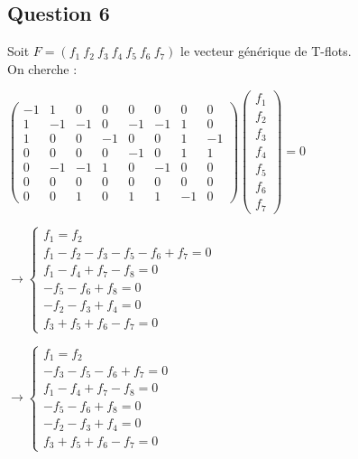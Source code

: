 \subsection{Question 6}
Soit $F=(f_1\ f_2\ f_3\ f_4\ f_5\ f_6\ f_7)$ le vecteur générique de T-flots.\\
On cherche : 
\begin{center}

$\begin{pmatrix}
-1 & 1 & 0 & 0 & 0 & 0 & 0 & 0\\
 1 &-1 &-1 & 0 &-1 &-1 & 1 & 0\\
 1 & 0 & 0 &-1 & 0 & 0 & 1 &-1\\
 0 & 0 & 0 & 0 &-1 & 0 & 1 & 1\\
 0 &-1 &-1 & 1 & 0 &-1 & 0 & 0\\
 0 & 0 & 0 & 0 & 0 & 0 & 0 & 0\\
 0 & 0 & 1 & 0 & 1 & 1 &-1 & 0
\end{pmatrix}
\begin{pmatrix}
f_1\\
f_2\\ 
f_3\\ 
f_4\\ 
f_5\\ 
f_6\\ 
f_7
\end{pmatrix}
=0
$

\vspace{0.5cm}

$\rightarrow 
\begin{cases}
f_1 = f_2\\
f_1 - f_2 - f_3 - f_5 - f_6 + f_7 = 0\\
f_1 - f_4 + f_7 - f_8 = 0\\
-f_5 - f_6 + f_8 = 0\\
-f_2 - f_3 + f_4 = 0\\
f_3 + f_5 + f_6 - f_7 = 0
\end{cases}$

\vspace{0.5cm}

$\rightarrow 
\begin{cases}
f_1 = f_2\\
- f_3 - f_5 - f_6 + f_7 = 0\\
f_1 - f_4 + f_7 - f_8 = 0\\
-f_5 - f_6 + f_8 = 0\\
-f_2 - f_3 + f_4 = 0\\
f_3 + f_5 + f_6 - f_7 = 0
\end{cases}$


\end{center}
